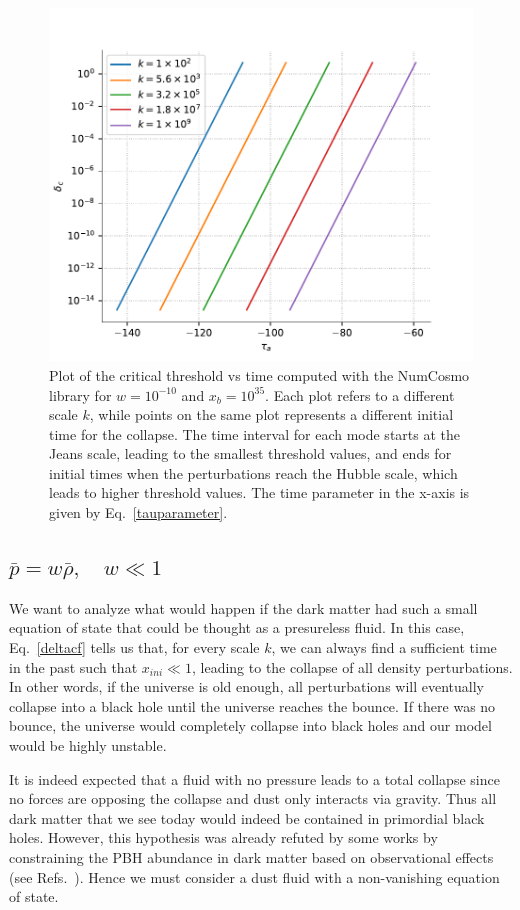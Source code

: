 \documentclass[a4paper,11pt]{article}
\begin{document}
\begin{figure}[tbp]
	\centering
	\includegraphics[width=.6\textwidth]{deltac_jh_vs_tau.pdf}
	\caption{ Plot of the critical threshold vs time computed with the NumCosmo library for $w = 10^{-10}$ and $x_b = 10^{35}$. Each plot refers to a different scale $k$, while points on the same plot represents a different initial time for the collapse. The time interval for each mode starts at the Jeans scale, leading to the smallest threshold values, and ends for initial times when the perturbations reach the Hubble scale, which leads to higher threshold values. The time parameter in the x-axis is given by Eq.~\eqref{tauparameter}.}
	\label{deltacfig}
\end{figure}
\newpage
\subsection{$\bar{p} = w \bar{\rho}, \quad w \ll 1$}

We want to analyze what would happen if the dark matter had such a small equation of
state that could be thought as a presureless fluid. In this case, Eq.~\eqref{deltacf}
tells us that, for every scale $k$, we can always find a sufficient time in the past
such that $x_{ini} \ll 1$, leading to the collapse of all density perturbations. In
other words, if the universe is old enough, all perturbations will eventually collapse
into a black hole until the universe reaches the bounce. If there was no bounce, the
universe would completely collapse into black holes and our model would be highly
unstable.

It is indeed expected that a fluid with no pressure leads to a total collapse since no forces are opposing the collapse and dust only interacts via gravity. Thus all dark matter that we see today would indeed be contained in primordial black holes. However, this hypothesis was already refuted by some works by constraining the PBH abundance in dark matter based on observational effects (see Refs.~\cite{Villanueva2021, Carr2021}). Hence we must consider a dust fluid with a non-vanishing equation of state.
\end{document}
